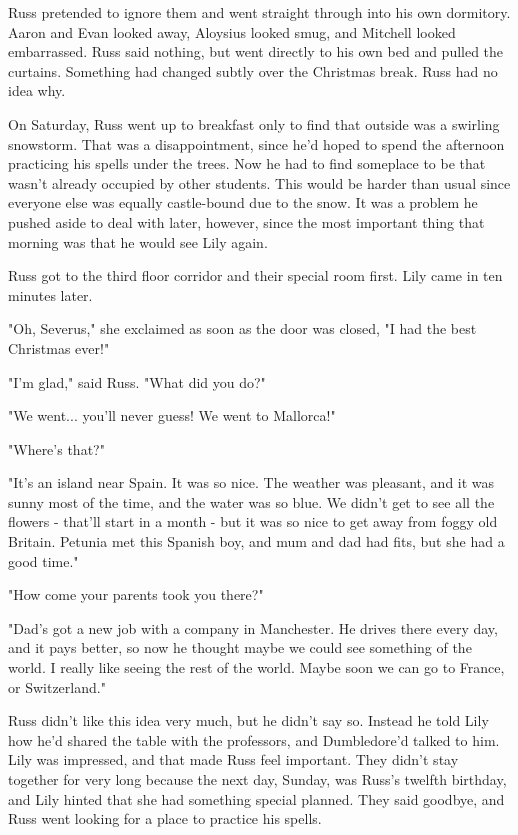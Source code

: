 \documentclass[a4paper,11pt]{article}
\begin{document}
Russ pretended to ignore them and went straight through into his own dormitory. Aaron and Evan looked away, Aloysius looked smug, and Mitchell looked embarrassed. Russ said nothing, but went directly to his own bed and pulled the curtains. Something had changed subtly over the Christmas break. Russ had no idea why.

On Saturday, Russ went up to breakfast only to find that outside was a swirling snowstorm. That was a disappointment, since he'd hoped to spend the afternoon practicing his spells under the trees. Now he had to find someplace to be that wasn't already occupied by other students. This would be harder than usual since everyone else was equally castle-bound due to the snow. It was a problem he pushed aside to deal with later, however, since the most important thing that morning was that he would see Lily again.

Russ got to the third floor corridor and their special room first. Lily came in ten minutes later.

"Oh, Severus," she exclaimed as soon as the door was closed, "I had the best Christmas ever!"

"I'm glad," said Russ. "What did you do?"

"We went... you'll never guess! We went to Mallorca!"

"Where's that?"

"It's an island near Spain. It was so nice. The weather was pleasant, and it was sunny most of the time, and the water was so blue. We didn't get to see all the flowers - that'll start in a month - but it was so nice to get away from foggy old Britain. Petunia met this Spanish boy, and mum and dad had fits, but she had a good time."

"How come your parents took you there?"

"Dad's got a new job with a company in Manchester. He drives there every day, and it pays better, so now he thought maybe we could see something of the world. I really like seeing the rest of the world. Maybe soon we can go to France, or Switzerland."

Russ didn't like this idea very much, but he didn't say so. Instead he told Lily how he'd shared the table with the professors, and Dumbledore'd talked to him. Lily was impressed, and that made Russ feel important. They didn't stay together for very long because the next day, Sunday, was Russ's twelfth birthday, and Lily hinted that she had something special planned. They said goodbye, and Russ went looking for a place to practice his spells.
\end{document}

